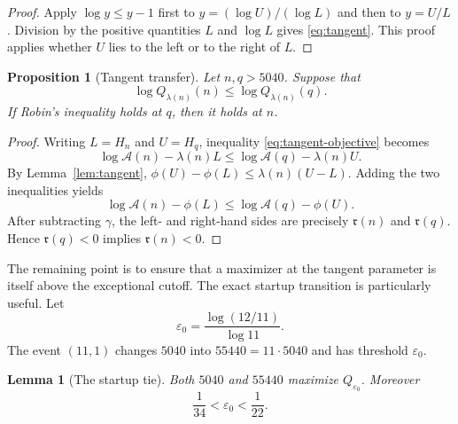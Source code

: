 \documentclass[11pt]{amsart}
\newtheorem{proposition}[theorem]{Proposition}
\newtheorem{lemma}[theorem]{Lemma}
\theoremstyle{definition}
\theoremstyle{remark}
\numberwithin{equation}{section}
\newcommand{\euler}{\gamma}
\newcommand{\A}{\mathcal{A}}
\newcommand{\M}{\mathfrak r}
\newcommand{\eps}{\varepsilon}
\begin{document}
\begin{proof}
Apply $\log y\le y-1$ first to
$y=(\log U)/(\log L)$ and then to $y=U/L$.  Division by the positive
quantities $L$ and $\log L$ gives \eqref{eq:tangent}.  This proof applies
whether $U$ lies to the left or to the right of $L$.
\end{proof}

\begin{proposition}[Tangent transfer]\label{prop:tangent-transfer}
Let $n,q>5040$.  Suppose that
\begin{equation}\label{eq:tangent-objective}
  \log Q_{\lambda(n)}(n)
  \le \log Q_{\lambda(n)}(q).
\end{equation}
If Robin's inequality holds at $q$, then it holds at $n$.
\end{proposition}

\begin{proof}
Writing $L=H_n$ and $U=H_q$, inequality
\eqref{eq:tangent-objective} becomes
\[
  \log\A(n)-\lambda(n)L
  \le \log\A(q)-\lambda(n)U.
\]
By Lemma~\ref{lem:tangent},
$\phi(U)-\phi(L)\le\lambda(n)(U-L)$.  Adding the two inequalities yields
\[
  \log\A(n)-\phi(L)
  \le \log\A(q)-\phi(U).
\]
After subtracting $\euler$, the left- and right-hand sides are precisely
$\M(n)$ and $\M(q)$.  Hence $\M(q)<0$ implies $\M(n)<0$.
\end{proof}

The remaining point is to ensure that a maximizer at the tangent parameter
is itself above the exceptional cutoff.  The exact startup transition is
particularly useful.  Let
\begin{equation}\label{eq:epsilon-zero}
  \eps_0=\frac{\log(12/11)}{\log 11}.
\end{equation}
The event $(11,1)$ changes $5040$ into $55440=11\cdot5040$ and has threshold
$\eps_0$.

\begin{lemma}[The startup tie]\label{lem:startup-tie}
Both $5040$ and $55440$ maximize $Q_{\eps_0}$.  Moreover
\begin{equation}\label{eq:epsilon-enclosure}
  \frac1{34}<\eps_0<\frac1{22}.
\end{equation}
\end{lemma}
\end{document}
